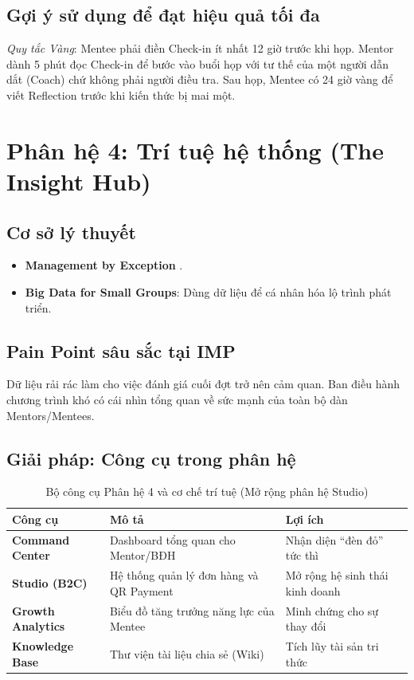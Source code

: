 \subsection{Gợi ý sử dụng để đạt hiệu quả tối đa}
\textit{Quy tắc Vàng}: Mentee phải điền Check-in ít nhất 12 giờ trước khi họp. Mentor dành 5 phút đọc Check-in để bước vào buổi họp với tư thế của một người dẫn dắt (Coach) chứ không phải người điều tra. Sau họp, Mentee có 24 giờ vàng để viết Reflection trước khi kiến thức bị mai một.

\section{Phân hệ 4: Trí tuệ hệ thống (The Insight Hub)}

\subsection{Cơ sở lý thuyết}
\begin{itemize}
  \item \textbf{Management by Exception} \citep{mbe1961}.
  \item \textbf{Big Data for Small Groups}: Dùng dữ liệu để cá nhân hóa lộ trình phát triển.
\end{itemize}

\subsection{Pain Point sâu sắc tại IMP}
Dữ liệu rải rác làm cho việc đánh giá cuối đợt trở nên cảm quan. Ban điều hành chương trình khó có cái nhìn tổng quan về sức mạnh của toàn bộ dàn Mentors/Mentees.

\subsection{Giải pháp: Công cụ trong phân hệ}

\begin{table}[H]
  \centering
  \begin{tabularx}{\textwidth}{|L|L|L|}
    \hline
     \textbf{\color{white} Công cụ} & \textbf{\color{white} Mô tả} & \textbf{\color{white} Lợi ích} \\ \hline
    \textbf{Command Center} & Dashboard tổng quan cho Mentor/BĐH & Nhận diện ``đèn đỏ'' tức thì \\ \hline
    \textbf{Studio (B2C)} & Hệ thống quản lý đơn hàng và QR Payment & Mở rộng hệ sinh thái kinh doanh \\ \hline
    \textbf{Growth Analytics} & Biểu đồ tăng trưởng năng lực của Mentee & Minh chứng cho sự thay đổi \\ \hline
    \textbf{Knowledge Base} & Thư viện tài liệu chia sẻ (Wiki) & Tích lũy tài sản tri thức \\ \hline
  \end{tabularx}
  \caption{Bộ công cụ Phân hệ 4 và cơ chế trí tuệ (Mở rộng phân hệ Studio)}
\end{table}

